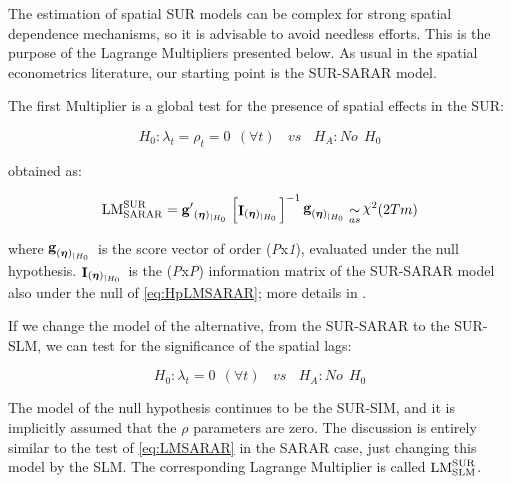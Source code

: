 \documentclass[article]{jss}
\begin{document}
The estimation of spatial SUR models can be complex for strong spatial dependence mechanisms, so it is advisable to avoid needless efforts. This is the purpose of the Lagrange Multipliers presented below. As usual in the spatial econometrics literature, our starting point is the SUR-SARAR model.

The first Multiplier is a global test for the presence of spatial effects in the SUR:

\begin{equation}
H_0 :\lambda_t =\rho_t =0 \ \ (\forall t)  \ \ \ \ vs  \ \  \ \ H_A: No  \ \ H_0
\label{eq:HpLMSARAR}
\end{equation}

obtained as:

\begin{equation}
\mathop{{\rm LM}}\nolimits_{{\rm SARAR}}^{{\rm SUR}} =
{\mathop{{\bf g}'}\nolimits_{({\boldsymbol\eta})_{\left|\mathop{H}\nolimits_{0} \right. }}}
\left[\mathop{{\bf I}}\nolimits_{({\boldsymbol\eta})_{\left|\mathop{H}\nolimits_{0} \right. }} \right]^{-1}
{\mathop{{\bf g}}\nolimits_{({\boldsymbol\eta})_{\left|\mathop{H}\nolimits_{0} \right. }}}
\mathop{\sim }\limits_{as} \mathop{\chi }\nolimits^{2} (2Tm)
\label{eq:LMSARAR}
\end{equation}

where \(\mathop{{\bf g}}\nolimits_{({\boldsymbol\eta})_{\left|\mathop{H}\nolimits_{0} \right. }}\) is the score vector of order (\emph{P}x\emph{1}), evaluated under the null hypothesis. \(\mathop{\bf I}\nolimits_{({\boldsymbol \eta} )_{\left|\mathop{H}\nolimits_{0} \right. }}\) is the (\emph{P}x\emph{P}) information matrix of the SUR-SARAR model also under the null of \eqref{eq:HpLMSARAR}; more details in \citet{Mur2010}.

If we change the model of the alternative, from the SUR-SARAR to the SUR-SLM, we can test for the significance of the spatial lags:

\begin{equation}
H_0 :\lambda_t =0 \ \ (\forall t)  \ \ \ \ vs  \ \  \ \ H_A: No  \ \ H_0
\label{eq:HpLMSLM}
\end{equation}

The model of the null hypothesis continues to be the SUR-SIM, and it is implicitly assumed that the \(\rho\) parameters are zero. The discussion is entirely similar to the test of \eqref{eq:LMSARAR} in the SARAR case, just changing this model by the SLM. The corresponding Lagrange Multiplier is called \({\rm LM}_{\rm SLM}^{\rm SUR}\).
\end{document}
